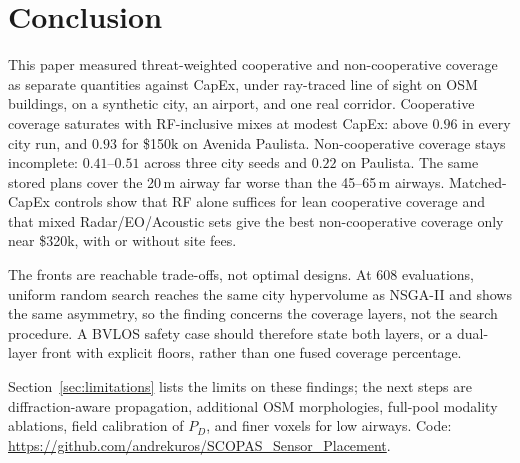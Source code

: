
\section{Conclusion}

This paper measured threat-weighted cooperative and non-cooperative coverage as separate quantities against CapEx, under ray-traced line of sight on OSM buildings, on a synthetic city, an airport, and one real corridor. Cooperative coverage saturates with RF-inclusive mixes at modest CapEx: above \(0.96\) in every city run, and \(0.93\) for \$150k on Avenida Paulista. Non-cooperative coverage stays incomplete: \(0.41\)--\(0.51\) across three city seeds and \(0.22\) on Paulista. The same stored plans cover the 20\,m airway far worse than the 45--65\,m airways. Matched-CapEx controls show that RF alone suffices for lean cooperative coverage and that mixed Radar/EO/Acoustic sets give the best non-cooperative coverage only near \$320k, with or without site fees.

The fronts are reachable trade-offs, not optimal designs. At 608 evaluations, uniform random search reaches the same city hypervolume as NSGA-II and shows the same asymmetry, so the finding concerns the coverage layers, not the search procedure. A BVLOS safety case should therefore state both layers, or a dual-layer front with explicit floors, rather than one fused coverage percentage.

Section~\ref{sec:limitations} lists the limits on these findings; the next steps are diffraction-aware propagation, additional OSM morphologies, full-pool modality ablations, field calibration of \(P_D\), and finer voxels for low airways. Code: \url{https://github.com/andrekuros/SCOPAS_Sensor_Placement}.
